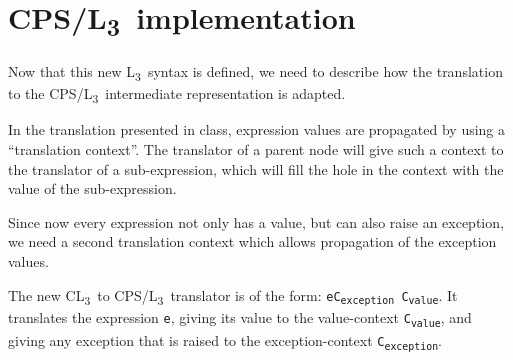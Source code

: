 \documentclass[12pt,a4paper]{article}
\newcommand{\lang}{L\textsubscript{3}~}
\newcommand{\ts}[2]{#1\textsubscript{#2}}
\newcommand{\code}[1]{\texttt{#1}}
\newcommand{\tran}[3]{\code{\textlbrackdbl #1\textrbrackdbl #2 #3}}
\begin{document}
\section{CPS/\lang implementation}

Now that this new \lang syntax is defined, we need to describe how the translation to the CPS/\lang intermediate representation is adapted.

In the translation presented in class, expression values are propagated by using a ``translation context''. The translator of a parent node will give such a context to the translator of a sub-expression, which will fill the hole in the context with the value of the sub-expression.

Since now every expression not only has a value, but can also raise an exception, we need a second translation context which allows propagation of the exception values.

The new C\lang to CPS/\lang translator is of the form: \tran{e}{\ts{C}{exception}}{\ts{C}{value}}. It translates the expression \code{e}, giving its value to the value-context \code{\ts{C}{value}}, and giving any exception that is raised to the exception-context \code{\ts{C}{exception}}.
\end{document}
